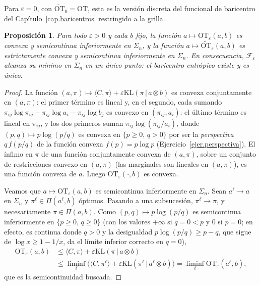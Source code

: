 \documentclass[12pt, a4paper]{amsbook}
\newtheorem{prop}[teo]{Proposición}
\theoremstyle{remark}
\theoremstyle{definition}
\numberwithin{section}{chapter}
\numberwithin{subsection}{section}
\numberwithin{equation}{section}
\numberwithin{figure}{chapter}
\begin{document}
Para $\varepsilon=0$, con $\widetilde{\mathrm{OT}}_0=\mathrm{OT}$, esta es la versión
discreta del funcional de baricentro del Capítulo~\ref{cap.baricentros}
restringido a la grilla.

\begin{prop}\label{prop.baricentro.entropico}
Para todo $\varepsilon>0$ y cada $b$ fijo, la función
$a\mapsto\mathrm{OT}_\varepsilon(a,b)$ es convexa y semicontinua
inferiormente en $\Sigma_n$, y la función $a\mapsto\widetilde{\mathrm{OT}}_\varepsilon(a,b)$
es estrictamente convexa y semicontinua inferiormente en $\Sigma_n$. En
consecuencia, $\mathcal F_\varepsilon$ alcanza su mínimo en $\Sigma_n$ en un
único punto: el baricentro entrópico existe y es único.
\end{prop}

\begin{proof}
La función $(a,\pi)\mapsto\langle C,\pi\rangle+\varepsilon\mathrm{KL}(\pi\,|\,a\otimes b)$
es convexa conjuntamente en $(a,\pi)$: el primer término es lineal y, en el
segundo, cada sumando $\pi_{ij}\log\pi_{ij}-\pi_{ij}\log a_i-\pi_{ij}\log b_j$
es convexo en $(\pi_{ij},a_i)$: el último término es lineal en $\pi_{ij}$, y
los dos primeros suman $\pi_{ij}\log(\pi_{ij}/a_i)$, donde
$(p,q)\mapsto p\log(p/q)$ es convexa en $\{p\ge0,\,q>0\}$ por ser la
\emph{perspectiva} $q\,f(p/q)$ de la función convexa $f(p)=p\log p$
(Ejercicio~\ref{ejer.perspectiva}). El ínfimo en $\pi$ de una función
conjuntamente convexa de $(a,\pi)$, sobre un conjunto de restricciones convexo
en $(a,\pi)$ (las marginales son lineales en $(a,\pi)$), es una función
convexa de $a$. Luego $\mathrm{OT}_\varepsilon(\cdot,b)$ es convexa.

Veamos que $a\mapsto\mathrm{OT}_\varepsilon(a,b)$
es semicontinua inferiormente en $\Sigma_n$. Sean
$a^\ell\to a$ en $\Sigma_n$ y $\pi^\ell\in\Pi(a^\ell,b)$ óptimos. Pasando a una
subsucesión, $\pi^\ell\to\pi$, y necesariamente $\pi\in\Pi(a,b)$. Como
$(p,q)\mapsto p\log(p/q)$ es semicontinua inferiormente en
$\{p\ge0,\,q\ge0\}$ (con los valores $+\infty$ si $q=0<p$ y $0$ si $p=0$; en
efecto, es continua donde $q>0$ y la desigualdad $p\log(p/q)\ge p-q$, que
sigue de $\log x\ge1-1/x$, da el límite inferior correcto en $q=0$),
\[
\begin{aligned}
\mathrm{OT}_\varepsilon(a,b)
&\le\langle C,\pi\rangle+\varepsilon\mathrm{KL}(\pi\,|\,a\otimes b)\\
&\le\liminf_\ell\bigl(\langle C,\pi^\ell\rangle
+\varepsilon\mathrm{KL}(\pi^\ell\,|\,a^\ell\otimes b)\bigr)
=\liminf_\ell\mathrm{OT}_\varepsilon(a^\ell,b),
\end{aligned}
\]
que es la semicontinuidad buscada.


\end{proof}
\end{document}
